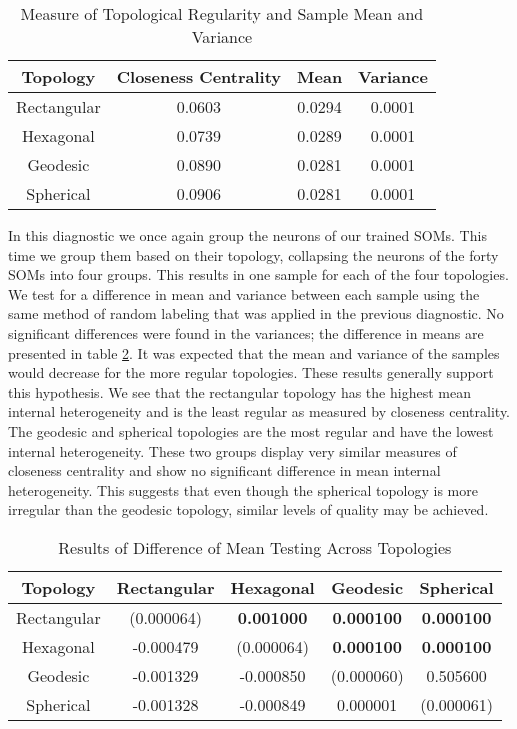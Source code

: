 \begin{table}
\centering
\begin{minipage}{\textwidth}
\caption{Measure of Topological Regularity and Sample Mean and Variance}
\label{vardeg}
\begin{tabular}{|c||c|c|c|}
\hline
Topology & Closeness Centrality & Mean & Variance\\
\hline
Rectangular & 0.0603 & 0.0294 &0.0001\\
Hexagonal & 0.0739 & 0.0289 &0.0001\\
Geodesic & 0.0890 & 0.0281 &0.0001\\
Spherical & 0.0906 & 0.0281 &0.0001\\
\hline
\end{tabular}
\end{minipage}
\end{table}

In this diagnostic we once again group the neurons of our trained SOMs. This
time we group them based on their topology, collapsing the neurons of the
forty SOMs into four groups.  This results in one sample for each of the four
topologies.  We test for a
difference in mean and variance between each sample using the same method of
random labeling that was applied in the previous diagnostic.  No significant
differences were found in the variances; the difference in means are presented
in table \ref{rlt:all}.  It was expected that the mean and variance of the
samples would decrease for the more regular topologies.  These results
generally support this hypothesis. We see that the rectangular topology has
the highest mean internal heterogeneity and is the least regular as measured by
closeness centrality. The geodesic and spherical topologies are the most
regular and have the lowest internal heterogeneity. These two groups display very
similar measures of closeness centrality and show no significant difference in
mean internal heterogeneity.  This suggests that even though the spherical topology
is more irregular than the geodesic topology, similar levels of quality may be
achieved.


\begin{table}
  \begin{minipage}{\textwidth}
  \caption{Results of Difference of Mean Testing Across Topologies}
  \label{rlt:all}
  \begin{tabular}{|c||c|c|c|c|}
  \hline
  \textbf{Topology}&Rectangular	&Hexagonal &Geodesic &Spherical\\\hline
  \hline
   Rectangular & (0.000064) & \textbf{0.001000} & \textbf{0.000100} & \textbf{0.000100}\\\hline
   Hexagonal & -0.000479 & (0.000064) & \textbf{0.000100} & \textbf{0.000100}\\\hline
   Geodesic & -0.001329 & -0.000850 & (0.000060) & 0.505600\\\hline
   Spherical & -0.001328 & -0.000849 & 0.000001 & (0.000061)\\\hline

  \end{tabular}
  \end{minipage}
\end{table}



